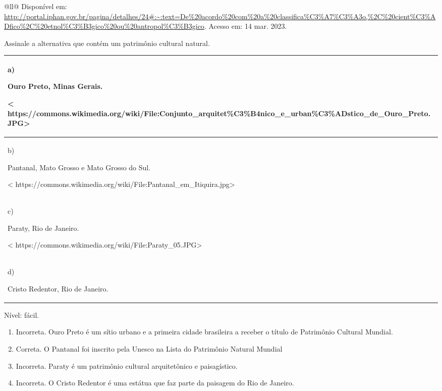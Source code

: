 \begin{itemize}
\begin{itemize}
\begin{escolha}[]{@{}ll@{}}
Disponível em:
\url{http://portal.iphan.gov.br/pagina/detalhes/24\#:~:text=De\%20acordo\%20com\%20a\%20classifica\%C3\%A7\%C3\%A3o,\%2C\%20cient\%C3\%ADfico\%2C\%20etnol\%C3\%B3gico\%20ou\%20antropol\%C3\%B3gico}.
Acesso em: 14 mar. 2023.

Assinale a alternativa que contém um patrimônio cultural natural.

\begin{longtable}[]{@{}l@{}}
\toprule
\begin{minipage}[b]{0.97\columnwidth}\raggedright\strut
a)

Ouro Preto, Minas Gerais.

\textless{}
https://commons.wikimedia.org/wiki/File:Conjunto\_arquitet\%C3\%B4nico\_e\_urban\%C3\%ADstico\_de\_Ouro\_Preto.JPG\textgreater{}\strut
\end{minipage}\tabularnewline
\midrule
\endhead
\begin{minipage}[t]{0.97\columnwidth}\raggedright\strut
b)

Pantanal, Mato Grosso e Mato Grosso do Sul.

\textless{}
https://commons.wikimedia.org/wiki/File:Pantanal\_em\_Itiquira.jpg\textgreater{}\strut
\end{minipage}\tabularnewline
\begin{minipage}[t]{0.97\columnwidth}\raggedright\strut
c)

Paraty, Rio de Janeiro.

\textless{}
https://commons.wikimedia.org/wiki/File:Paraty\_05.JPG\textgreater{}\strut
\end{minipage}\tabularnewline
\begin{minipage}[t]{0.97\columnwidth}\raggedright\strut
d)

Cristo Redentor, Rio de Janeiro.\strut
\end{minipage}\tabularnewline
\bottomrule
\end{longtable}

Nível: fácil.

\begin{enumerate}
\def\labelenumi{\alph{enumi})}
\item
  Incorreta. Ouro Preto é um sítio urbano e a primeira cidade brasileira
  a receber o título de Patrimônio Cultural Mundial.
\item
  Correta. O Pantanal foi inscrito pela Unesco na Lista do Patrimônio
  Natural Mundial
\item
  Incorreta. Paraty é um patrimônio cultural arquitetônico e
  paisagístico.
\item
  Incorreta. O Cristo Redentor é uma estátua que faz parte da paisagem
  do Rio de Janeiro.
\end{enumerate}


\end{escolha}
\end{itemize}
\end{itemize}
